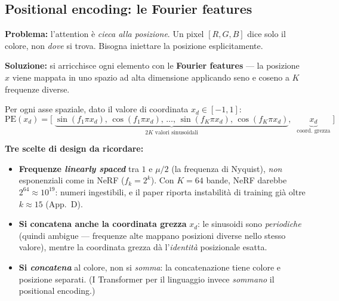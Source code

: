 \documentclass[11pt]{article}
\newcommand{\curstage}{0}
\newcommand{\stage}[1]{\gdef\curstage{#1}}
\begin{document}
\subsection{Positional encoding: le Fourier features}
\stage{2}

\textbf{Problema:} l'attention è \emph{cieca alla posizione}. Un pixel $[R,G,B]$ dice solo il colore, non \emph{dove} si trova. Bisogna iniettare la posizione esplicitamente.

\textbf{Soluzione:} si arricchisce ogni elemento con le \textbf{Fourier features} --- la posizione $x$ viene mappata in uno spazio ad alta dimensione applicando seno e coseno a $K$ frequenze diverse.

\begin{formulabox}[title={\textbf{Fourier positional encoding}}]
Per ogni asse spaziale, dato il valore di coordinata $x_d \in [-1,1]$:
\[
\text{PE}(x_d) = \Big[\;\underbrace{\sin(f_1 \pi x_d),\,\cos(f_1 \pi x_d),\,\ldots,\,\sin(f_K \pi x_d),\,\cos(f_K \pi x_d)}_{2K\text{ valori sinusoidali}},\;\;\underbrace{x_d}_{\text{coord.\ grezza}}\;\Big]
\]
\end{formulabox}

\textbf{Tre scelte di design da ricordare:}

\begin{itemize}
\item \textbf{Frequenze \emph{linearly spaced}} tra $1$ e $\mu/2$ (la frequenza di Nyquist), \emph{non} esponenziali come in NeRF ($f_k = 2^k$). Con $K=64$ bande, NeRF darebbe $2^{64}\approx 10^{19}$: numeri ingestibili, e il paper riporta instabilità di training già oltre $k\approx15$ (App.~D).
\item \textbf{Si concatena anche la coordinata grezza} $x_d$: le sinusoidi sono \emph{periodiche} (quindi ambigue --- frequenze alte mappano posizioni diverse nello stesso valore), mentre la coordinata grezza dà l'\emph{identità} posizionale esatta.
\item \textbf{Si \emph{concatena}} al colore, non si \emph{somma}: la concatenazione tiene colore e posizione separati. (I Transformer per il linguaggio invece \emph{sommano} il positional encoding.)
\end{itemize}
\end{document}
